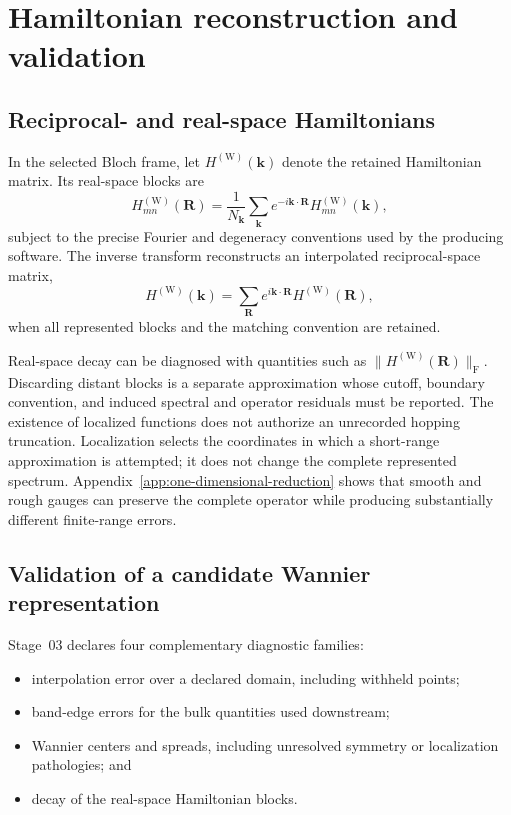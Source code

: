 \section{Hamiltonian reconstruction and validation}

\subsection{Reciprocal- and real-space Hamiltonians}


In the selected Bloch frame, let $H^{(\mathrm W)}(\mathbf k)$ denote the
retained Hamiltonian matrix. Its real-space blocks are
\begin{equation}
  H^{(\mathrm W)}_{mn}(\mathbf R)
  =
  \frac{1}{N_{\mathbf k}}
  \sum_{\mathbf k}e^{-i\mathbf k\cdot\mathbf R}
  H^{(\mathrm W)}_{mn}(\mathbf k),
\end{equation}
subject to the precise Fourier and degeneracy conventions used by the producing
software. The inverse transform reconstructs an interpolated reciprocal-space
matrix,
\begin{equation}
  H^{(\mathrm W)}(\mathbf k)
  =
  \sum_{\mathbf R}e^{i\mathbf k\cdot\mathbf R}
  H^{(\mathrm W)}(\mathbf R),
\end{equation}
when all represented blocks and the matching convention are retained.

Real-space decay can be diagnosed with quantities such as
$\|H^{(\mathrm W)}(\mathbf R)\|_{\mathrm F}$. Discarding distant blocks is a
separate approximation whose cutoff, boundary convention, and induced spectral
and operator residuals must be reported. The existence of localized functions
does not authorize an unrecorded hopping truncation. Localization selects the
coordinates in which a short-range approximation is attempted; it does not
change the complete represented spectrum. Appendix~\ref{app:one-dimensional-reduction}
shows that smooth and rough gauges can preserve the complete operator while
producing substantially different finite-range errors.

\subsection{Validation of a candidate Wannier representation}


Stage~03 declares four complementary diagnostic families:

\begin{itemize}
  \item interpolation error over a declared domain, including withheld points;
  \item band-edge errors for the bulk quantities used downstream;
  \item Wannier centers and spreads, including unresolved symmetry or
    localization pathologies; and
  \item decay of the real-space Hamiltonian blocks.
\end{itemize}

